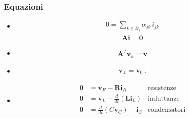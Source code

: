 \documentclass[letterpaper,10pt,italian]{jupyterBook}
\begin{document}
\subsubsection*{Equazioni}
\begin{itemize}
\item {} 
\sphinxAtStartPar
{}
\begin{equation*}
\begin{split}0 = \sum_{k \in B_j} \alpha_{jk} \, i_{jk}\end{split}
\end{equation*}\begin{equation*}
\begin{split}\mathbf{A} \mathbf{i} = \mathbf{0}\end{split}
\end{equation*}
\item {} 
\sphinxAtStartPar
{}
\begin{equation*}
\begin{split}\mathbf{A}^T \mathbf{v}_{n} = \mathbf{v}\end{split}
\end{equation*}
\item {} 
\sphinxAtStartPar
{}
\begin{equation*}
\begin{split}\mathbf{v}_{\perp} = \mathbf{v}_0 \ .\end{split}
\end{equation*}
\item {} 
\sphinxAtStartPar
{}
\begin{equation*}
\begin{split}\begin{aligned}
    \mathbf{0} & = \mathbf{v}_R - \mathbf{R} \mathbf{i}_R & \text{resistenze} \\
    \mathbf{0} & = \mathbf{v}_L - \frac{d}{dt} \left( \mathbf{L} \mathbf{i}_L \right) & \text{induttanze} \\
    \mathbf{0} & = \frac{d}{dt} \left( C \mathbf{v}_C \right) - \mathbf{i}_C & \text{condensatori} \\
  \end{aligned}\end{split}
\end{equation*}
\end{itemize}

\sphinxstepscope
\end{document}
